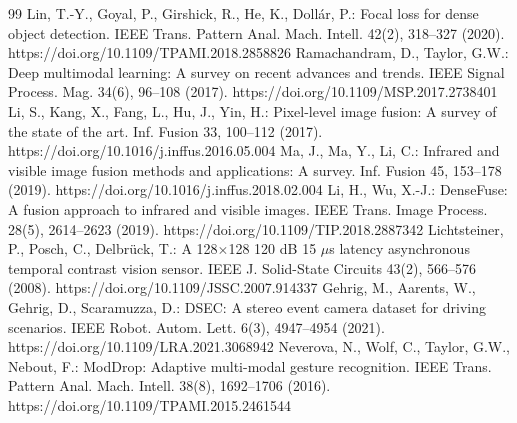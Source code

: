 \begin{thebibliography}{99}
 Lin, T.-Y., Goyal, P., Girshick, R., He, K., Doll\'{a}r, P.: Focal loss for dense object detection. IEEE Trans. Pattern Anal. Mach. Intell. 42(2), 318--327 (2020). https://doi.org/10.1109/TPAMI.2018.2858826
 Ramachandram, D., Taylor, G.W.: Deep multimodal learning: A survey on recent advances and trends. IEEE Signal Process. Mag. 34(6), 96--108 (2017). https://doi.org/10.1109/MSP.2017.2738401
 Li, S., Kang, X., Fang, L., Hu, J., Yin, H.: Pixel-level image fusion: A survey of the state of the art. Inf. Fusion 33, 100--112 (2017). https://doi.org/10.1016/j.inffus.2016.05.004
 Ma, J., Ma, Y., Li, C.: Infrared and visible image fusion methods and applications: A survey. Inf. Fusion 45, 153--178 (2019). https://doi.org/10.1016/j.inffus.2018.02.004
 Li, H., Wu, X.-J.: DenseFuse: A fusion approach to infrared and visible images. IEEE Trans. Image Process. 28(5), 2614--2623 (2019). https://doi.org/10.1109/TIP.2018.2887342
 Lichtsteiner, P., Posch, C., Delbr\"uck, T.: A 128$\times$128 120 dB 15 $\mu$s latency asynchronous temporal contrast vision sensor. IEEE J. Solid-State Circuits 43(2), 566--576 (2008). https://doi.org/10.1109/JSSC.2007.914337
 Gehrig, M., Aarents, W., Gehrig, D., Scaramuzza, D.: DSEC: A stereo event camera dataset for driving scenarios. IEEE Robot. Autom. Lett. 6(3), 4947--4954 (2021). https://doi.org/10.1109/LRA.2021.3068942
 Neverova, N., Wolf, C., Taylor, G.W., Nebout, F.: ModDrop: Adaptive multi-modal gesture recognition. IEEE Trans. Pattern Anal. Mach. Intell. 38(8), 1692--1706 (2016). https://doi.org/10.1109/TPAMI.2015.2461544
\end{thebibliography}
